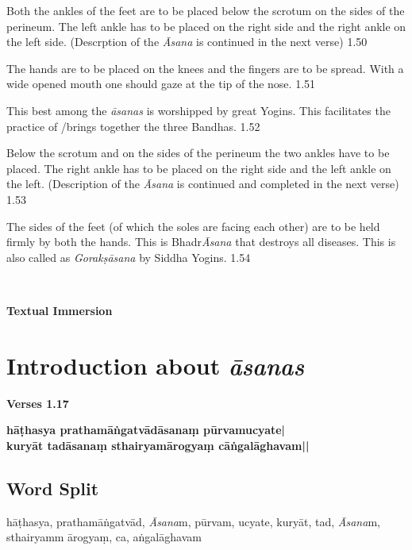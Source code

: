 Both the ankles of the feet are to be placed below the scrotum on the sides of the perineum. The left ankle has to be placed on the right side and the right ankle on the left side. (Descrption of the \textit{Āsana} is continued in the next verse) 1.50

The hands are to be placed on the knees and the fingers are to be spread. With a wide opened mouth one should gaze at the tip of the nose. 1.51


This best among the \textit{āsanas} is worshipped by great Yogins. This facilitates the practice of /brings together the three Bandhas.  1.52
\medskip


Below the scrotum and on the sides of the perineum the two ankles have to be placed. The right ankle has to be placed on the right side and the left ankle on the left. (Description of the \textit{Āsana} is continued and completed in the next verse) 1.53

The sides of the feet (of which the soles are facing each other) are to be held firmly by both the hands. This is Bhadr\textit{Āsana} that destroys all diseases. This is also called as \textit{Gorakṣāsana} by Siddha Yogins. 1.54
\newpage

\thispagestyle{empty}
~
\vfill
\begin{center}
\textbf{\Huge Textual Immersion}
\end{center}
\vfill
\eject

\section*{Introduction about \textit{āsanas}}


\noindent \textbf{Verses 1.17}

\begin{shloka}
\textbf{hāṭhasya prathamāṅgatvādāsanaṃ pūrvamucyate|}\\
\textbf{kuryāt tadāsanaṃ sthairyamārogyaṃ  cāṅgalāghavam||}
\end{shloka}

\subsection*{Word Split}

hāṭhasya, prathamāṅgatvād, \textit{Āsana}m, pūrvam, ucyate, kuryāt,  tad, \textit{Āsana}m, sthairyamm ārogyaṃ,  ca, aṅgalāghavam

